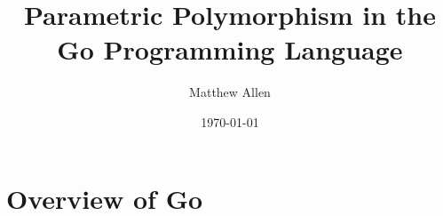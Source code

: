 \documentclass[12pt]{beamer}
\title[Parametric Polymorphism in Go]{Parametric Polymorphism in the Go Programming Language} %
\author{Matthew Allen} %
\institute[University of Texas] %
{
University of Texas at Austin \\ %
Supervisor: Jan S. Rellermeyer
}
\date{\today} %
\begin{document}
\newcommand{\codestyle}[1]{\texttt{\color{codeBlue}#1}}
\makeatletter
\renewcommand\verbatim@font{\color{codeBlue}\normalfont\ttfamily}
\makeatletter

\begin{frame}
\titlepage %
\end{frame}



\section{Overview of Go} %


\end{document}
